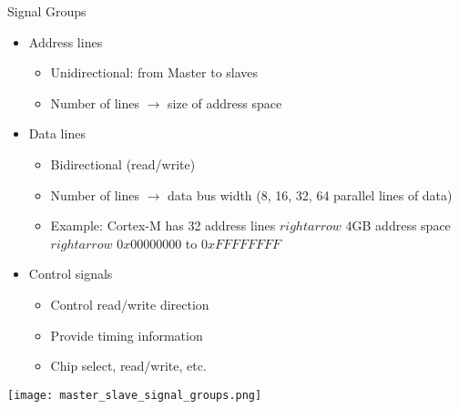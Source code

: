 \begin{theorem}{Signal Groups}
    \begin{itemize}
        \item Address lines
        \begin{itemize}
            \item Unidirectional: from Master to slaves
            \item Number of lines $\rightarrow$ size of address space
        \end{itemize}
        \item Data lines
        \begin{itemize}
            \item Bidirectional (read/write)
            \item Number of lines $\rightarrow$ data bus width (8, 16, 32, 64 parallel lines of data)
            \item Example: Cortex-M has 32 address lines $rightarrow$ 4GB address space $rightarrow$ $0x00000000$ to $0xFFFFFFFF$
        \end{itemize}
        \item Control signals
        \begin{itemize}
            \item Control read/write direction
            \item Provide timing information
            \item Chip select, read/write, etc.
        \end{itemize}
    \end{itemize}
    \texttt{[image: master\_slave\_signal\_groups.png]}
\end{theorem}

